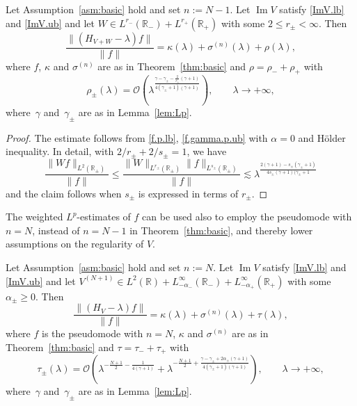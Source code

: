\begin{Theorem}\label{thm:Lr}
Let Assumption~\ref{asm:basic} hold and set $n:=N-1$. 
Let ${\operatorname{Im}} V$ satisfy \eqref{ImV.lb} and \eqref{ImV.ub} and let $W \in L^{r_-}({\mathbb{R}}_-) + L^{r_+}({\mathbb{R}}_+)$ with some $2 \leq r_\pm < \infty$. Then
\begin{equation}\label{HVW.f.ign}
\frac{\|(H_{V+W}-\lambda) f\|}{\|f\|} 
= \kappa(\lambda) + \sigma^{(n)}(\lambda) + \rho(\lambda),
\end{equation}
where $f$, $\kappa$ and $\sigma^{(n)}$ are as in Theorem~\ref{thm:basic} 
and $\rho = \rho_- + \rho_+$ with
\begin{equation}
\rho_\pm(\lambda) = {\mathcal{O}}\left(\lambda^\frac{\gamma-\gamma_\pm - \frac 2{r_\pm} (\gamma+1)}{4(\gamma_\pm+1)(\gamma+1)}\right), \qquad \lambda \to + \infty,
\end{equation}
where~$\gamma$ and~$\gamma_\pm$ are as in Lemma~\ref{lem:Lp}.
\end{Theorem}
\begin{proof}
The estimate follows from \eqref{f.p.lb}, \eqref{f.gamma.p.ub} with $\alpha=0$ and H\"older inequality. In detail, with $2/r_\pm+ 2/s_\pm =1$, we have
\begin{equation}
\frac{\|Wf\|_{L^2({\mathbb{R}}_\pm)}}{\|f\|} 
\leq 
\frac{\|W\|_{L^{r_\pm}({\mathbb{R}}_\pm)}\|f\|_{L^{s_\pm}({\mathbb{R}}_\pm)}}{\|f\|} 
{\lesssim} 
\lambda^\frac{2(\gamma+1) -s_\pm(\gamma_\pm+1)}{4s_\pm(\gamma+1)(\gamma_\pm+1}
\end{equation}
and the claim follows when $s_\pm$ is  expressed in terms of $r_\pm$.
\end{proof}
The weighted $L^p$-estimates of $f$ can be used also to employ the pseudomode with $n=N$, instead of $n=N-1$ in Theorem~\ref{thm:basic}, and thereby lower assumptions on the regularity of $V$. 
\begin{Theorem}\label{thm:N+1}
Let Assumption~\ref{asm:basic} hold and set $n:=N$. 
Let ${\operatorname{Im}} V$ satisfy \eqref{ImV.lb} and \eqref{ImV.ub} 
and let $V^{(N+1)} \in L^2({\mathbb{R}}) + L^\infty_{-\alpha_-}({\mathbb{R}}_-) + L^\infty_{-\alpha_+}({\mathbb{R}}_+)$ with some $\alpha_\pm \geq 0$. 
Then
\begin{equation}\label{HVW.f.N+1}
\frac{\|(H_V-\lambda) f\|}{\|f\|} 
= \kappa(\lambda) + \sigma^{(n)}(\lambda) + \tau(\lambda),
\end{equation}
where $f$ is the pseudomode with $n=N$, $\kappa$ 
and $\sigma^{(n)}$ are as in Theorem~\ref{thm:basic} and $\tau= \tau_- + \tau_+$ with
\begin{equation}
\tau_\pm(\lambda) = 
{\mathcal{O}}
\left(
\lambda^{-\frac{N+1}{2} - \frac{1}{4(\gamma+1)}}
+
\lambda^{-\frac{N+1}{2} + \frac{\gamma-\gamma_\pm 
+ 2 \alpha_\pm  (\gamma+1) }{4(\gamma_\pm+1)(\gamma+1)}}
\right), \qquad \lambda \to + \infty,
\end{equation}
where~$\gamma$ and~$\gamma_\pm$ are as in Lemma~\ref{lem:Lp}.
\end{Theorem}
